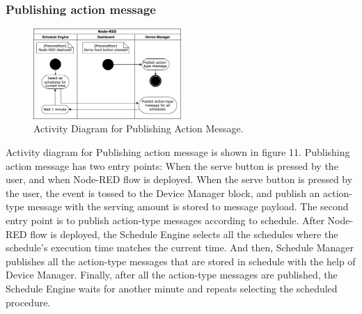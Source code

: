 \documentclass[conference]{IEEEtran}
\begin{document}
\subsubsection{Publishing action message}
\begin{figure}[htbp]
\centerline{\includegraphics[width=0.5\textwidth]{./images/publishActionMessage.png}}
\caption{Activity Diagram for Publishing Action Message.}
\label{fig}
\end{figure}
Activity diagram for Publishing action message is shown in figure 11. Publishing action message has two entry points: When the serve button is pressed by the user, and when Node-RED flow is deployed. When the serve button is pressed by the user, the event is tossed to the Device Manager block, and publish an action-type message with the serving amount is stored to message payload. The second entry point is to publish action-type messages according to schedule. After Node-RED flow is deployed, the Schedule Engine selects all the schedules where the schedule’s execution time matches the current time. And then, Schedule Manager publishes all the action-type messages that are stored in schedule with the help of Device Manager. Finally, after all the action-type messages are published, the Schedule Engine waits for another minute and repeats selecting the scheduled procedure.

\hfill \break
\end{document}
